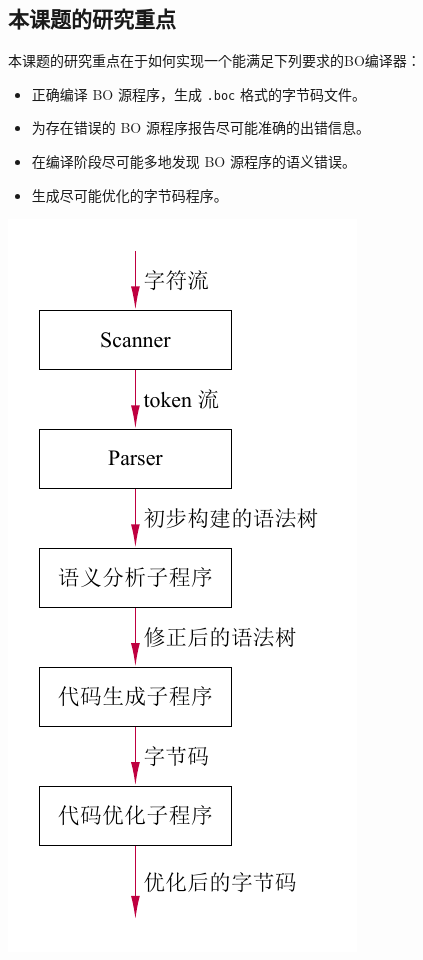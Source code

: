 \documentclass[dvipsnames, svgnames, x11names]{beamer}
\begin{document}
\subsection{本课题的研究重点}
\begin{frame}
    \begin{minipage}{.5\linewidth}
    \onslide<+-> 本课题的研究重点在于如何实现一个能满足下列要求的BO编译器：
    \begin{itemize}[<+-| alert@+>]
        \item 正确编译 BO 源程序，生成 \texttt{.boc} 格式的字节码文件。
        \item 为存在错误的 BO 源程序报告尽可能准确的出错信息。
        \item 在编译阶段尽可能多地发现 BO 源程序的语义错误。
        \item 生成尽可能优化的字节码程序。
    \end{itemize}
    \end{minipage}
    \quad\quad
    \begin{minipage}{.4\linewidth}
    \includegraphics[height=\textheight]{../figure/compileProcess(2).pdf}
    \end{minipage}
    {\onslide<+->}
\end{frame}
% 
    
\end{document}
